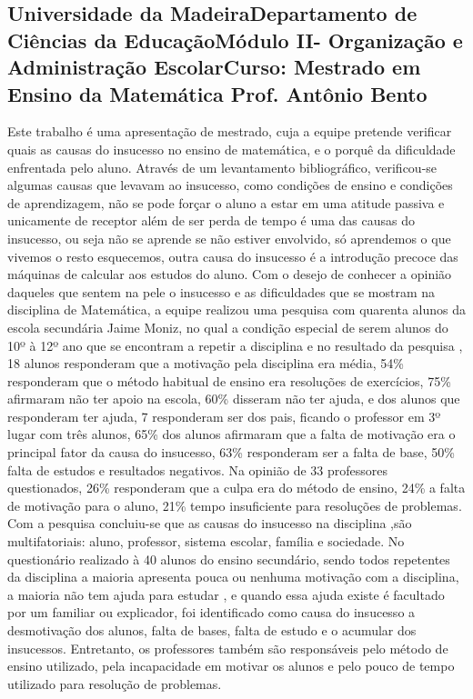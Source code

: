 \documentclass[12pt,a4paper]{article}
\begin{document}
\subsection{Universidade da MadeiraDepartamento de Ciências da EducaçãoMódulo  II- Organização e Administração EscolarCurso: Mestrado em Ensino da Matemática Prof. Antônio Bento}
Este trabalho é uma apresentação de mestrado, cuja a equipe pretende verificar quais as causas do insucesso no ensino de matemática, e o porquê da dificuldade enfrentada pelo aluno. 
 Através de um levantamento bibliográfico, verificou-se algumas causas que levavam ao insucesso, como condições de ensino e condições de aprendizagem, não se pode forçar o aluno a estar em uma atitude passiva e unicamente de receptor além de ser perda de tempo é uma das causas do insucesso, ou seja não se aprende se não estiver envolvido, só aprendemos o que vivemos o resto esquecemos, outra causa do insucesso é a introdução precoce das máquinas de calcular aos estudos do aluno.
Com o desejo de conhecer a opinião daqueles que sentem na pele o insucesso e as dificuldades que se mostram na disciplina de Matemática, a equipe realizou uma pesquisa com quarenta alunos da escola secundária Jaime Moniz, no qual a condição especial de serem alunos do 10º à 12º ano que se encontram a repetir a disciplina e no resultado da pesquisa , 18 alunos responderam que a motivação pela disciplina era média, 54\% responderam que o método habitual de ensino era resoluções de exercícios, 75\% afirmaram não ter apoio na escola, 60\% disseram não ter ajuda, e dos alunos que responderam ter ajuda, 7 responderam ser dos pais, ficando o professor em 3º lugar com três alunos, 65\% dos alunos afirmaram que a falta de motivação era o principal fator da causa do insucesso, 63\%  responderam ser a falta de base, 50\% falta de estudos e resultados negativos. 
Na opinião de 33 professores questionados, 26\% responderam que a culpa era do método de ensino, 24\% a falta de motivação para o aluno, 21\% tempo insuficiente para resoluções de problemas. 
Com a pesquisa concluiu-se que as causas do insucesso na disciplina ,são multifatoriais: aluno, professor, sistema escolar, família e sociedade. No questionário realizado à 40 alunos do ensino secundário, sendo todos repetentes da disciplina a maioria apresenta pouca ou nenhuma motivação com a disciplina, a maioria não tem ajuda para estudar , e quando essa ajuda existe é facultado por um familiar ou explicador, foi identificado como causa do insucesso a desmotivação dos alunos, falta de bases, falta de estudo e o acumular dos insucessos. Entretanto, os professores também são responsáveis pelo método de ensino utilizado, pela incapacidade em motivar os alunos e pelo pouco de tempo utilizado para resolução de problemas. 
\end{document}
